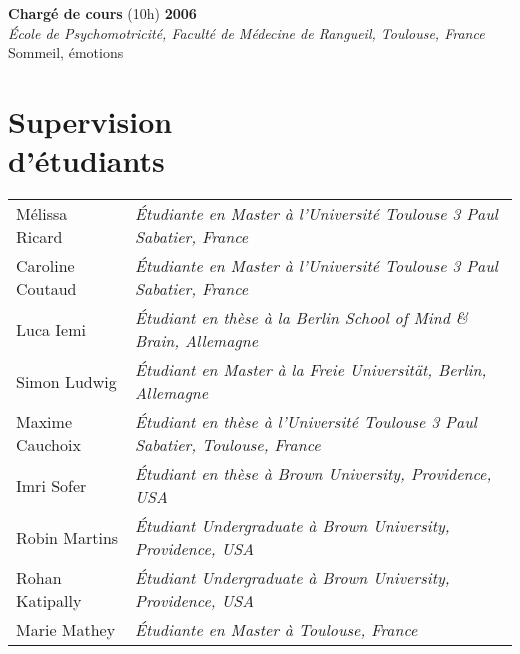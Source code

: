 \documentclass[margin,line]{resume}
\begin{document}
\begin{resume}
	\vspace{-2mm} 
	\textbf{Chargé de cours} (10h) \hfill \textbf{2006}\\
	\textsl{\'Ecole de Psychomotricité, Faculté de Médecine de Rangueil, Toulouse, France}\\
	Sommeil, émotions


\vspace{3mm}
\section{\mysidestyle Supervision\\d'étudiants}
	
	\begin{tabular}{@{}ll} %
	Mélissa Ricard & \textsl{\'Etudiante en Master à l'Université Toulouse 3 Paul Sabatier, France}\\
	Caroline Coutaud & \textsl{\'Etudiante en Master à l'Université Toulouse 3 Paul Sabatier, France}\\
	Luca Iemi       & \textsl{\'Etudiant en thèse à la Berlin School of Mind \& Brain, Allemagne}\\
	Simon Ludwig    & \textsl{\'Etudiant en Master à la Freie Universität, Berlin, Allemagne}\\
	Maxime Cauchoix & \textsl{\'Etudiant en thèse à l'Université Toulouse 3 Paul Sabatier, Toulouse, France}\\
	Imri Sofer      & \textsl{\'Etudiant en thèse à Brown University, Providence, USA}\\
	Robin Martins   & \textsl{\'Etudiant Undergraduate à Brown University, Providence, USA} \\
	Rohan Katipally & \textsl{\'Etudiant Undergraduate à Brown University, Providence, USA} \\
	Marie Mathey    & \textsl{\'Etudiante en Master à Toulouse, France}
	\end{tabular}
	





\end{resume}
\end{document}
